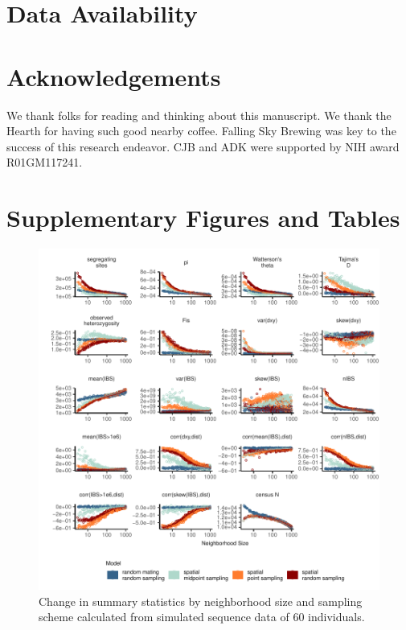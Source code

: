\documentclass[11pt,twoside,lineno]{preprint}
\newif\ifcomments
\newcommand{\ak}[1]{\ifcomments{{\color{red} \it (#1)}}\else{}\fi}
\begin{document}
\section{Data Availability}
\ak{github repo}

\section{Acknowledgements}
We thank folks for reading and thinking about this manuscript. We thank the Hearth for having such good nearby coffee. Falling Sky Brewing was key to the success of this research endeavor. CJB and ADK were supported by NIH award R01GM117241. 





\section{Supplementary Figures and Tables}
\beginsupplement

\afterpage{\clearpage}
\begin{figure}[p]
\centering
\includegraphics[width=\textwidth]{figures/sumstats_by_neighbors_allstats.pdf}
\caption{Change in summary statistics by neighborhood size and sampling scheme calculated from simulated sequence data of 60 individuals.}
\label{fig:allsumstats} 
\end{figure}
\end{document}

